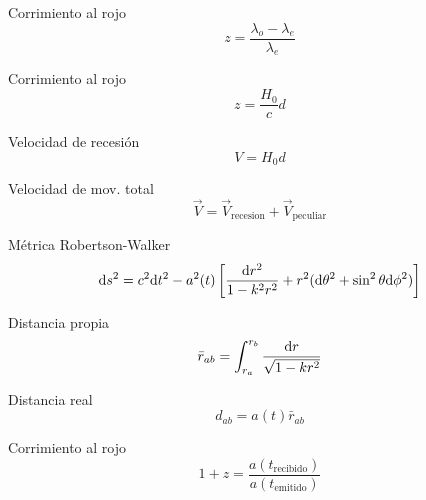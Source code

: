 \begin{multicols}{2}

\begin{Formulario}
    Corrimiento al rojo
	\begin{equation*}
		z = \frac{\lambda_o - \lambda_e}{\lambda_e}
	\end{equation*}
\end{Formulario}

\begin{Formulario}
    Corrimiento al rojo
	\begin{equation*}
		z = \frac{H_0}{c}d
	\end{equation*}
\end{Formulario}

\begin{Formulario}
    Velocidad de recesión
	\begin{equation*}
		V = H_0 d
	\end{equation*}
\end{Formulario}

\begin{Formulario}
    Velocidad de mov. total
	\begin{equation*}
		\vec{V} = \vec{V}_{\text{recesion}} + \vec{V}_{\text{peculiar}}
	\end{equation*}
\end{Formulario}

\begin{Formulario}
    Métrica Robertson-Walker
	\begin{equation*}
		\mathrm{d} s^2 = c^2 \mathrm{d} t^2 - a^2(t) \left[ \frac{\mathrm{d} r^2}{1-k^2 r^2} + r^2 (\mathrm{d} \theta^2 + \sin^2 \theta \mathrm{d} \phi^2) \right]
	\end{equation*}
\end{Formulario}

\begin{Formulario}
    Distancia propia
	\begin{equation*}
		\bar{r}_{ab} = \int_{r_a}^{r_b} \frac{\mathrm{d} r}{\sqrt{1-kr^2}}
	\end{equation*}
\end{Formulario}

\begin{Formulario}
    Distancia real
	\begin{equation*}
		d_{ab} = a(t) \bar{r}_{ab}
	\end{equation*}
\end{Formulario}

\begin{Formulario}
    Corrimiento al rojo
	\begin{equation*}
		1 + z = \frac{a(t_{\text{recibido}})}{a(t_{\text{emitido}})}
	\end{equation*}
\end{Formulario}


\end{multicols}
